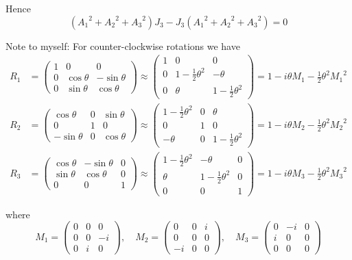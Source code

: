 Hence
\begin{equation*}
\left({A_1}^2+{A_2}^2+{A_3}^2\right)J_3-J_3\left({A_1}^2+{A_2}^2+{A_3}^2\right)=0
\end{equation*}

Note to myself: For counter-clockwise rotations we have
\begin{align*}
R_1&=\begin{pmatrix}1&0&0\\0&\cos\theta&-\sin\theta\\0&\sin\theta&\cos\theta\end{pmatrix}
\approx\begin{pmatrix}1&0&0\\0&1-\tfrac{1}{2}\theta^2&-\theta\\0&\theta&1-\tfrac{1}{2}\theta^2\end{pmatrix}
=1-i\theta M_1-\tfrac{1}{2}\theta^2{M_1}^2
\\
R_2&=\begin{pmatrix}\cos\theta&0&\sin\theta\\0&1&0\\-\sin\theta&0&\cos\theta\end{pmatrix}
\approx\begin{pmatrix}1-\tfrac{1}{2}\theta^2&0&\theta\\0&1&0\\-\theta&0&1-\tfrac{1}{2}\theta^2\end{pmatrix}
=1-i\theta M_2-\tfrac{1}{2}\theta^2{M_2}^2
\\
R_3&=\begin{pmatrix}\cos\theta&-\sin\theta&0\\\sin\theta&\cos\theta&0\\0&0&1\end{pmatrix}
\approx\begin{pmatrix}1-\tfrac{1}{2}\theta^2&-\theta&0\\\theta&1-\tfrac{1}{2}\theta^2&0\\0&0&1\end{pmatrix}
=1-i\theta M_3-\tfrac{1}{2}\theta^2{M_3}^2
\end{align*}

where
\begin{equation*}
M_1=\begin{pmatrix}0&0&0\\0&0&-i\\0&i&0\end{pmatrix},\quad
M_2=\begin{pmatrix}0&0&i\\0&0&0\\-i&0&0\end{pmatrix},\quad
M_3=\begin{pmatrix}0&-i&0\\i&0&0\\0&0&0\end{pmatrix}
\end{equation*}


